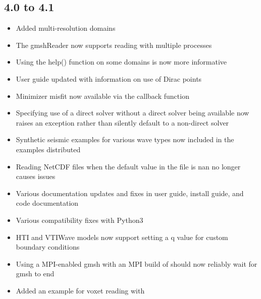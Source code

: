 \subsection*{4.0 to 4.1}
\begin{itemize}
  \item Added multi-resolution \ripley domains
  \item The gmshReader now supports reading with multiple processes
  \item Using the help() function on some domains is now more informative
  \item User guide updated with information on use of Dirac points
  \item Minimizer misfit now available via the callback function
  \item Specifying use of a direct solver without a direct solver being available now raises an exception rather than silently default to a non-direct solver
  \item Synthetic seismic examples for various wave types now included in the examples distributed
  \item Reading NetCDF files when the default value in the file is nan no longer causes issues
  \item Various documentation updates and fixes in user guide, install guide, and code documentation
  \item Various compatibility fixes with Python3
  \item HTI and VTIWave models now support setting a q value for custom boundary conditions
  \item Using a MPI-enabled gmsh with an MPI build of \escript should now reliably wait for gmsh to end
  \item Added an example for voxet reading with \ripley
\end{itemize}

